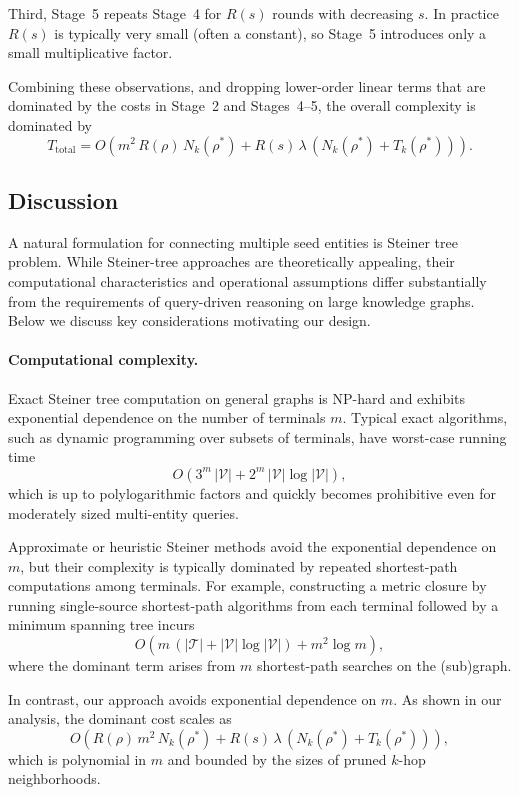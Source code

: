 Third, Stage~5 repeats Stage~4 for $R(s)$ rounds with decreasing $s$.
In practice $R(s)$ is typically very small (often a constant), so Stage~5 introduces only a small multiplicative factor.

Combining these observations, and dropping lower-order linear terms that are dominated by the costs in Stage~2 and Stages~4--5,
the overall complexity is dominated by
\[
T_{\text{total}}
=
O\!\left(
m^2\, R(\rho)\,N_k(\rho^*)
+
R(s)\,\lambda\,(N_k(\rho^*)+T_k(\rho^*))
\right).
\]

\subsection{Discussion}
A natural formulation for connecting multiple seed entities is Steiner tree problem.
While Steiner-tree approaches are theoretically appealing, their computational characteristics
and operational assumptions differ substantially from the requirements of query-driven reasoning on large knowledge graphs.
Below we discuss key considerations motivating our design.

\paragraph{Computational complexity.}
Exact Steiner tree computation on general graphs is NP-hard and exhibits exponential dependence on the number of terminals $m$.
Typical exact algorithms, such as dynamic programming over subsets of terminals, have worst-case running time
\[
O\!\left(3^{m}\,|\mathcal V| + 2^{m}\,|\mathcal V|\log|\mathcal V|\right),
\]
which is up to polylogarithmic factors and quickly becomes prohibitive even for moderately sized multi-entity queries.

Approximate or heuristic Steiner methods avoid the exponential dependence on $m$,
but their complexity is typically dominated by repeated shortest-path computations among terminals.
For example, constructing a metric closure by running single-source shortest-path algorithms from each terminal
followed by a minimum spanning tree incurs
\[
O\!\left(m\,(|\mathcal T| + |\mathcal V|\log|\mathcal V|) + m^2\log m\right),
\]
 where the dominant term arises from $m$ shortest-path searches on the (sub)graph.

In contrast, our approach avoids exponential dependence on $m$.
As shown in our analysis, the dominant cost scales as
\[
O\!\left(
R(\rho)\,m^2\,N_k(\rho^*)
+
R(s)\,\lambda\,(N_k(\rho^*)+T_k(\rho^*))
\right),
\]
which is polynomial in $m$ and bounded by the sizes of pruned $k$-hop neighborhoods.

